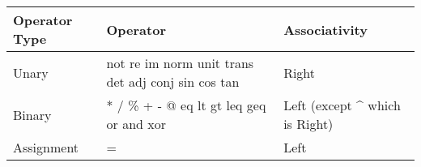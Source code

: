 \begin{flushleft}
\begin{tabular}{|l|l|l|}
	\hline    
	                   
	Operator Type & 
	Operator & 
	Associativity\\
	
	\hline
	
	Unary & 
	not re im norm unit trans det adj conj sin cos tan & 
	Right\\
	Binary & 
	* / \% + - @ eq lt gt leq geq or and xor &
	Left (except \string^ which is Right)\\
	Assignment &
	= 
	& Left\\
	
	\hline  
\end{tabular}
\end{flushleft}